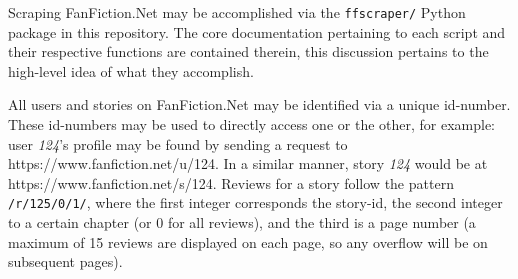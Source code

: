 \documentclass[letterpaper]{article}
\begin{document}
Scraping FanFiction.Net may be accomplished via the \texttt{ffscraper/} Python package in this repository. The core documentation pertaining to each script and their respective functions are contained therein, this discussion pertains to the high-level idea of what they accomplish.

All users and stories on FanFiction.Net may be identified via a unique id-number. These id-numbers may be used to directly access one or the other, for example: user \textit{124}'s profile may be found by sending a request to https://www.fanfiction.net/u/124. In a similar manner, story \textit{124} would be at https://www.fanfiction.net/s/124. Reviews for a story follow the pattern \texttt{/r/125/0/1/}, where the first integer corresponds the story-id, the second integer to a certain chapter (or 0 for all reviews), and the third is a page number (a maximum of 15 reviews are displayed on each page, so any overflow will be on subsequent pages).



\end{document}
